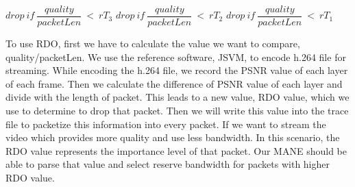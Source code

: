 \begin{algorithm}
    \begin{algorithmic}[1]
        $drop\ if\ \dfrac{quality}{packetLen}\ <\ rT_3$
        \Else 
            $drop\ if\ \dfrac{quality}{packetLen}\ <\ rT_2$
            \Else{}
                $drop\ if\ \dfrac{quality}{packetLen}\ <\ rT_1$
                \Else \ 
                \EndIf
            \EndIf
        \EndIf
        
        \EndProcedure
    \end{algorithmic}
\end{algorithm}

To use RDO, first we have to calculate the value we want to compare, quality/packetLen. We use the reference software, JSVM, to encode h.264 file for streaming. While encoding the h.264 file, we record the PSNR value of each layer of each frame. Then we calculate the difference of PSNR value of each layer and divide with the length of packet. This leads to a new value, RDO value, which we use to determine to drop that packet. Then we will write this value into the trace file to packetize this information into every packet. If we want to stream the video which provides more quality and use less bandwidth. In this scenario, the RDO value represents the importance level of that packet. Our MANE should be able to parse that value and select reserve bandwidth for packets with higher RDO value.

